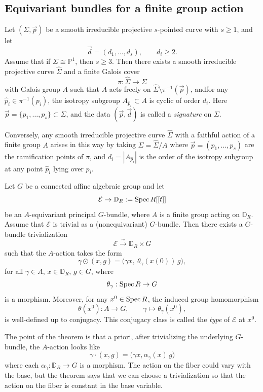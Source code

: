 \documentclass[12pt]{article}
\begin{document}
\subsection{Equivariant bundles for a finite group action}
\begin{theorem}\label{thm:galois-cover}
Let \((\Sigma,\vec p)\) be a smooth irreducible projective \(s\)-pointed curve with \(s \ge 1\), and let
\[
\vec d = (d_1,\dots,d_s), \qquad d_i \ge 2.
\]
Assume that if \(\Sigma \cong \mathbb P^1\), then \(s \ge 3\). Then there exists a smooth irreducible projective curve \(\widehat{\Sigma}\) and a finite Galois cover
\[
\pi \colon \widehat{\Sigma} \to \Sigma
\]
with Galois group \(A\) such that \(A\) acts freely on \(\widehat{\Sigma} \setminus \pi^{-1}(\vec p)\), andfor any \(\hat p_i \in \pi^{-1}(p_i)\), the isotropy subgroup $A_{\hat p_i} \subset A$
    is cyclic of order \(d_i\). Here \(\vec p = \{p_1,\dots,p_s\} \subset \Sigma\), and the data \((\vec p,\vec d)\) is called a \emph{signature} on \(\Sigma\).

Conversely, any smooth irreducible projective curve \(\widehat{\Sigma}\) with a faithful action of a finite group \(A\) arises in this way by taking $\Sigma = \widehat{\Sigma}/A$
where \(\vec p = (p_1,\dots,p_s)\) are the ramification points of \(\pi\), and $d_i = |A_{\hat p_i}|$
is the order of the isotropy subgroup at any point \(\hat p_i\) lying over \(p_i\).
\end{theorem}

\begin{theorem}\label{thm:local-equivariant}
Let \(G\) be a connected affine algebraic group and let
\[
\mathcal E \to \mathbb D_R := \operatorname{Spec} R[[t]]
\]
be an \(A\)-equivariant principal \(G\)-bundle, where \(A\) is a finite group acting on \(\mathbb D_R\).
Assume that \(\mathcal E\) is trivial as a (nonequivariant) \(G\)-bundle. Then there exists a \(G\)-bundle trivialization
\[
\mathcal E \xrightarrow{\sim} \mathbb D_R \times G
\]
such that the \(A\)-action takes the form
\[
\gamma \odot (x,g)
=
\bigl(\gamma x,\ \theta_\gamma(x(0))\, g\bigr),
\]
for all \(\gamma \in A\), \(x \in \mathbb D_R\), \(g \in G\), where
\[
\theta_\gamma : \operatorname{Spec} R \to G
\]
is a morphism. Moreover, for any \(x^0 \in \operatorname{Spec} R\), the induced group homomorphism
\[
\theta(x^0) : A \to G, \qquad \gamma \mapsto \theta_\gamma(x^0),
\]
is well-defined up to conjugacy. This conjugacy class is called the \emph{type} of \(\mathcal E\) at \(x^0\).
\end{theorem}
The point of the theorem is that a priori, after trivializing the underlying $G$-bundle, the $A$-action looks like \[
\gamma\cdot (x,g)=\bigl(\gamma x,\alpha_\gamma(x)\,g\bigr)\]
where each $\alpha_\gamma:\mathbb D_R\to G$
is a morphism. The action on the fiber could vary with the base, but the theorem says that we can choose a trivialization so that the action on the fiber is constant in the base variable.
\end{document}
